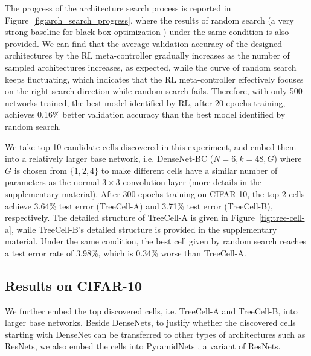 \documentclass{article}
\begin{document}
The progress of the architecture search process is reported in Figure~\ref{fig:arch_search_progress}, where the results of random search (a very strong baseline for black-box optimization \cite{bergstra2012random}) under the same condition is also provided. We can find that the average validation accuracy of the designed architectures by the RL meta-controller gradually increases as the number of sampled architectures increases, as expected, while the curve of random search keeps fluctuating, which indicates that the RL meta-controller effectively focuses on the right search direction while random search fails. Therefore, with only 500 networks trained, the best model identified by RL, after 20 epochs training, achieves 0.16$\%$ better validation accuracy than the best model identified by random search. 

We take top 10 candidate cells discovered in this experiment, and embed them into a relatively larger base network, i.e. DenseNet-BC ($N=6, k=48, G$) where $G$ is chosen from $\{1, 2, 4\}$ to make different cells have a similar number of parameters as the normal $3 \times 3$ convolution layer (more details in the supplementary material). After 300 epochs training on CIFAR-10, the top 2 cells achieve 3.64\% test error (TreeCell-A) and 3.71\% test error (TreeCell-B), respectively. The detailed structure of TreeCell-A is given in Figure~\ref{fig:tree-cell-a}, while TreeCell-B's detailed structure is provided in the supplementary material. Under the same condition, the best cell given by random search reaches a test error rate of 3.98\%, which is 0.34\% worse than TreeCell-A.



\subsection{Results on CIFAR-10}
We further embed the top discovered cells, i.e. TreeCell-A and TreeCell-B, into larger base networks. Beside DenseNets, to justify whether the discovered cells starting with DenseNet can be transferred to other types of architectures such as ResNets, we also embed the cells into PyramidNets \cite{han2016deep}, a variant of ResNets. 
\end{document}
